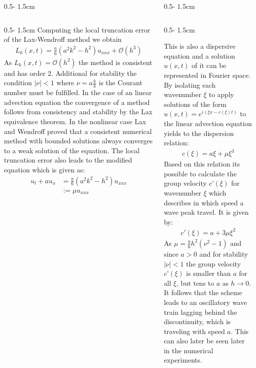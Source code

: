 \documentclass{uibposter}
\begin{document}
\begin{frame}[fragile]
\begin{columns}
\begin{column}{0.5\textwidth - 1.5cm}
\begin{column}{0.5\textwidth - 1.5cm}
\vspace{0.5cm}
Computing the local truncation error of the Lax-Wendroff method we obtain
\begin{align*}
L_k(x, t) = \frac{a}{6}(a^2 k^2 - h^2)u_{xxx} + \mathcal{O}(h^3)
\end{align*}
As $L_k(x,t) = \mathcal{O}(h^2)$ the method is consistent and has order 2. Additional for stability the condition $|\nu| < 1$ where $\nu = a\frac{k}{h}$ is the Courant number must be fulfilled. 
In the case of an linear advection equation the convergence of a method follows from consistency and stability by the Lax equivalence theorem. In the nonlinear case Lax and Wendroff proved that a consistent numerical method with bounded solutions always converges to a weak solution of the equation.
The local truncation error also leads to the modified equation which is given as:
\begin{align*}
u_t + a u_x &= \frac{a}{6} (a^2 k^2 - h^2) u_{xxx}\\
&:= \mu u_{xxx}
\end{align*}

    \end{column}
\end{column}
\begin{column}{0.5\textwidth - 1.5cm}
\begin{column}{0.5\textwidth - 1.5cm}
\vspace*{-1.5cm}


This is also a dispersive equation and a solution $u(x, t)$ of it can be represented in Fourier space. By isolating each wavenumber $\xi$ to apply solutions of the form $u(x,t) = e^{i(\xi x - c(\xi)t)}$ to the linear advection equation yields to the dispersion relation:
\begin{align*}
c(\xi) = a\xi + \mu \xi^3
\end{align*}
Based on this relation its possible to calculate the group velocity $c’(\xi)$ for wavenumber $\xi$ which describes in which speed a wave peak travel. It is given by:
\begin{align*}
c'(\xi) = a + 3\mu \xi^2
\end{align*}
As $\mu = \frac{a}{6}h^2(\nu^2 - 1)$ and since $a > 0$ and for stability $|\nu| < 1$ the group velocity $c’(\xi)$ is smaller than $a$ for all $\xi$, but tens to $a$ as $h\rightarrow0$. It follows that the scheme leads to an oscillatory wave train lagging behind the discontinuity, which is traveling with speed $a$. This can also later be seen later in the numerical experiments.
    

\end{column}
\end{column}
\end{columns}
\end{frame}
\end{document}
